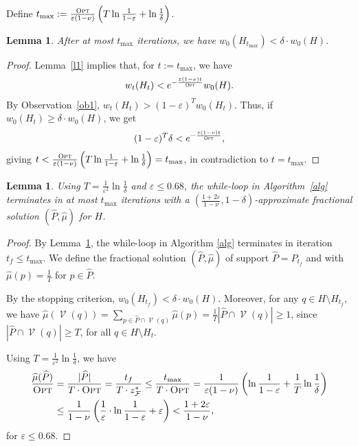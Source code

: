 \documentclass[a4paper,11pt]{article}
\newtheorem{lemma}[theorem]{Lemma}
\def\cF{\mathcal F}
\def\cV{\mathcal V}
\def\eps{\varepsilon}
\newcommand{\Vis}{\operatorname{\cV}}
\def \OPT {\textsc{Opt}}
\begin{document}
Define $t_{\max}:=\frac{\OPT}{\eps(1-\nu)}\left(T\ln\frac{1}{1-\eps}+\ln\frac{1}{\delta}\right)$.

\begin{lemma}\label{l-bd1} After at most $t_{\max}$ iterations, we have $w_0(H_{t_{\max}})<\delta\cdot w_0(H)$.
\end{lemma}
\begin{proof}
	Lemma~\ref{l1} implies that, for $t:=t_{\max}$, we have
	\begin{align*}
	w_t(H_t)<e^{-\frac{\eps(1-\nu)t}{\OPT}}w_{0}(H).
	\end{align*}
	By Observation~\ref{ob1}, $w_t(H_t)>(1-\eps)^Tw_0(H_t)$. Thus, if $w_0(H_t)\ge\delta\cdot w_0(H)$, we get
	\begin{align*}
	(1-\eps)^T\delta<e^{-\frac{\eps(1-\nu)t}{\OPT}},
	\end{align*}
	giving $t<\frac{\OPT}{\eps(1-\nu)}\left(T\ln\frac{1}{1-\eps}+\ln\frac{1}{\delta}\right)=t_{\max}$, in contradiction to $t=t_{\max}$.
\end{proof}


\begin{lemma}\label{l-bd2} Using $T=\frac1{\eps^2}\ln\frac{1}{\delta}$ and $\eps \leq 0.68$, the while-loop in Algorithm~\ref{alg} terminates in at most $t_{\max}$ iterations with a $(\frac{1+2\eps}{1-\nu},1-\delta)$-approximate fractional solution $(\widehat P,\widehat\mu)$ for $H$.
\end{lemma}
\begin{proof}
	By Lemma~\ref{l-bd1},  the while-loop in Algorithm \ref{alg} terminates in iteration $t_f \le t_{\max}$.
	We define the fractional solution $(\widehat P,\widehat\mu)$ of support $\widehat P=P_{t_f}$ and with $\widehat\mu(p)=\frac1T$ for $p\in \widehat P$.
	\medskip
	
	 By the stopping criterion, $w_0(H_{t_f})<\delta\cdot w_0(H)$. Moreover, for any $q\in H\setminus H_{t_f}$, we have
	$\widehat\mu(\Vis(q))=\sum_{p\in \widehat P\cap \Vis(q)}\widehat\mu(p)=\frac{1}{T}|\widehat P\cap \Vis(q)|\ge 1$, since $|\widehat P\cap \Vis(q)|\ge T$, for all $q\in H\setminus H_t$.
	
	\medskip
	
	Using $T=\frac1{\eps^2}\ln\frac{1}{\delta}$, we have
	\begin{align*}
	\frac{\widehat\mu(\widehat P)}{\OPT}&=\frac{|\widehat P|}{T\cdot \OPT}=\frac{t_f}{T\cdot z^*_\cF}\le\frac{t_{\max}}{T\cdot \OPT}=\frac{1}{\eps(1-\nu)}\left(\ln\frac{1}{1-\eps}+\frac1T\ln\frac{1}{\delta}\right)\\
	&\le\frac{1}{1-\nu}\left(\frac{1}{\eps}\cdot\ln\frac{1}{1-\eps}+\eps\right)<\frac{1+2\eps}{1-\nu},	
	\end{align*}
	for $\eps \leq 0.68$. 
\end{proof}
         
\end{document}
